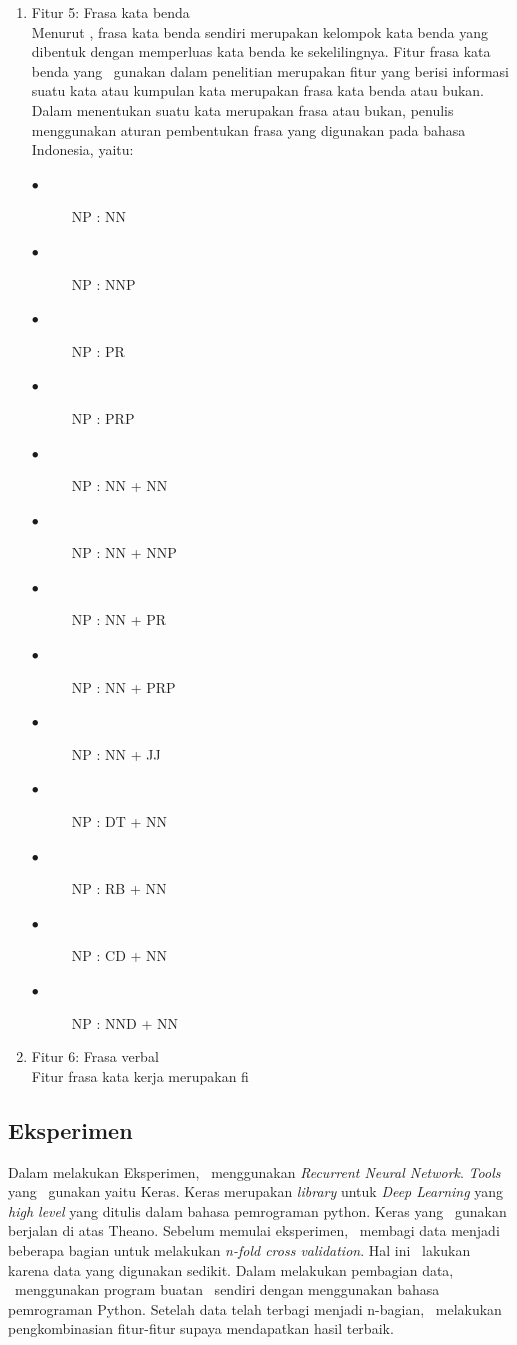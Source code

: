 \begin{enumerate}
		\item Fitur 5: Frasa kata benda\\
		Menurut \cite{hs2005bahasa}, frasa kata benda sendiri merupakan kelompok kata benda yang dibentuk dengan memperluas kata benda ke sekelilingnya. Fitur frasa kata benda yang \saya~gunakan dalam penelitian merupakan fitur yang berisi informasi suatu kata atau kumpulan kata merupakan frasa kata benda atau bukan. Dalam menentukan suatu kata merupakan frasa atau bukan, penulis menggunakan aturan pembentukan frasa yang digunakan pada bahasa Indonesia, yaitu:
		\begin{description}
		 	\item[$\bullet$] NP : NN
		 	\item[$\bullet$] NP : NNP
		 	\item[$\bullet$] NP : PR
		 	\item[$\bullet$] NP : PRP
		 	\item[$\bullet$] NP : NN + NN
		 	\item[$\bullet$] NP : NN + NNP
		 	\item[$\bullet$] NP : NN + PR
		 	\item[$\bullet$] NP : NN + PRP
		 	\item[$\bullet$] NP : NN + JJ
		 	\item[$\bullet$] NP : DT + NN
		 	\item[$\bullet$] NP : RB + NN
		 	\item[$\bullet$] NP : CD + NN
		 	\item[$\bullet$] NP : NND + NN
		 \end{description}
	 
		 \item Fitur 6: Frasa verbal\\
		 Fitur frasa kata kerja merupakan fi
	\end{enumerate}
	
	\subsection{Eksperimen}
	Dalam melakukan Eksperimen, \saya~menggunakan \textit{Recurrent Neural Network}. \textit{Tools} yang \saya~gunakan yaitu Keras. Keras merupakan \textit{library} untuk \textit{Deep Learning} yang \textit{high level} yang ditulis dalam bahasa pemrograman python. Keras yang \saya~gunakan berjalan di atas Theano.
	Sebelum memulai eksperimen, \saya~membagi data menjadi beberapa bagian untuk melakukan \textit{n-fold cross validation}. Hal ini \saya~lakukan karena data yang digunakan sedikit. Dalam melakukan pembagian data, \saya~menggunakan program buatan \saya~sendiri dengan menggunakan bahasa pemrograman Python.
	Setelah data telah terbagi menjadi n-bagian, \saya~melakukan pengkombinasian fitur-fitur supaya mendapatkan hasil terbaik.
